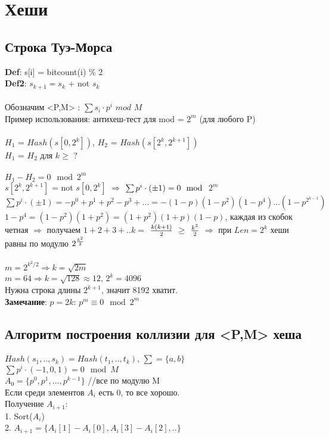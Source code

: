 ﻿
\section{Хеши}
\subsection{Строка Туэ-Морса}

\textbf{Def}: s[i] = bitcount(i) \% 2 \\
\textbf{Def2}: $s_{k+1} = s_k$ + not $s_k$ \\ \\
Обозначим <P,M> : $\sum s_i \cdot p^i $ $mod $ $M$ \\
Пример использования: антихеш-тест для mod = $2^{m}$ (для любого P) \\\\
$H_1$ = $Hash(s[0,2^k])$, $H_2$ = $Hash(s[2^k,2^{k+1}])$ \\
$H_1$ = $H_2$ для $k \ge$ ? \\\\
$H_1 - H_2 = 0 \mod 2^m$ \\
$s[2^k,2^{k+1}]$ = not $s[0,2^k]$ $\Rightarrow$ $\sum p^i \cdot (\pm1) = 0 \mod$ $2^{m}$  \\
$\sum p^i \cdot (\pm1) = -p^0 + p^1 + p^2 - p^3 + ... = -(1-p)(1-p^2)(1-p^4)...(1 - p^{2^{k-1}})$ \\
$1-p^4 = (1-p^2)(1+p^2) = (1+p^2)(1+p)(1-p)$, каждая из скобок четная $\Rightarrow $ получаем $1+2+3+..k = $ $k(k+1)\over{2}$ $ \ge$ $k^2\over{2}$ $\Rightarrow $ при $Len = 2^k$ хеши равны по модулю $2^{k^2\over{2}}$\\\\
$m = 2^{k^2/2} \Rightarrow k = \sqrt{2m}$ \\
$m = 64 \Rightarrow k = \sqrt{128} \approx 12$, $2^k = 4096$\\
Нужна строка длины $2^{k+1}$, значит 8192 хватит. \\
\textbf{Замечание}: $p = 2k$: $p^m \equiv 0 \mod 2^m$ \\

\subsection{Алгоритм построения коллизии для <P,M> хеша}

$Hash(s_1,..,s_k) = Hash(t_1,..,t_k)$, $\sum = \{a,b\} $ \\
$\sum p^i \cdot (-1,0,1) = 0 \mod M$ \\
$A_0 = \{p^0, p^1,...,p^{k-1}\}$  //все по модулю M \\
Если среди элементов $A_i$ есть 0, то все хорошо. \\
Получение $A_{i+1}: $ \\
1. Sort($A_i$) \\
2. $A_{i+1} = \{A_i[1]-A_i[0], A_i[3] - A_i[2],..\}$
  
